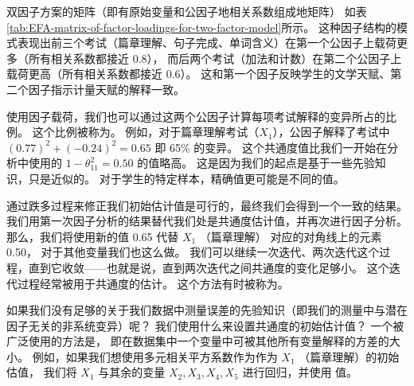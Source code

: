 双因子方案的矩阵（即有原始变量和公因子地相关系数组成地矩阵）
如表\ref{tab:EFA-matrix-of-factor-loadings-for-two-factor-model}所示。
这种因子结构的模式表现出前三个考试（篇章理解、句子完成、单词含义）在第一个公因子上载荷更多（所有相关系数都接近 0.8），
而后两个考试（加法和计数）在第二个公因子上载荷更高（所有相关系数都接近 0.6）。
这和第一个因子反映学生的文学天赋、第二个因子指示计量天赋的解释一致。


\begin{table}
    \centering
\end{table}

使用因子载荷，我们也可以通过这两个公因子计算每项考试解释的变异所占的比例。
这个比例被称为。
例如，对于篇章理解考试（$ X_1 $），公因子解释了考试中 $ (0.77)^2 + (-0.24)^2 = 0.65 $ 即 65\% 的变异。
这个共通度值比我们一开始在分析中使用的 $ 1 - \theta_{11}^2 = 0.50 $ 的值略高。
这是因为我们的起点是基于一些先验知识，只是近似的。
对于学生的特定样本，精确值更可能是不同的值。

通过跌多过程来修正我们初始估计值是可行的，最终我们会得到一个一致的结果。
我们用第一次因子分析的结果替代我们处是共通度估计值，并再次进行因子分析。
那么，我们将使用新的值 0.65 代替 $ X_1 $ （篇章理解） 对应的对角线上的元素 0.50，
对于其他变量我们也这么做。
我们可以继续一次迭代、两次迭代这个过程，直到它收敛——也就是说，直到两次迭代之间共通度的变化足够小。
这个迭代过程经常被用于共通度的估计。
这个方法有时被称为。

如果我们没有足够的关于我们数据中测量误差的先验知识（即我们的测量中与潜在因子无关的非系统变异）呢？
我们使用什么来设置共通度的初始估计值？
一个被广泛使用的方法是，
即在数据集中一个变量中可被其他所有变量解释的方差的大小。
例如，如果我们想使用多元相关平方系数作为作为 $ X_1 $ （篇章理解）的初始估值，
我们将 $ X_1 $ 与其余的变量 $ X_2, X_3, X_4, X_5 $ 进行回归，并使用 \rsquare 值。

